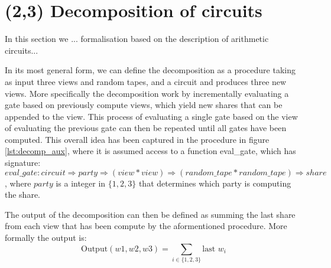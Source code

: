 \section{(2,3) Decomposition of circuits}
\label{sec:decomposition}
In this section we ... formalisation based on the description of arithmetic circuits...

In its most general form, we can define the decomposition as a procedure taking
as input three views and random tapes, and a circuit and produces three new
views. 
More specifically the decomposition work by incrementally evaluating a gate based on
previously compute views, which yield new shares that can be appended to the
view. This process of evaluating a single gate based on the view of evaluating
the previous gate can then be repeated until all gates have been computed. This
overall idea has been captured in the procedure in figure \ref{lst:decomp_aux},
where it is assumed access to a function eval\_gate, which has signature:
$eval\_gate : circuit \Rightarrow party \Rightarrow (view * view) \Rightarrow (random\_tape * random\_tape) \Rightarrow share$,
where $party$ is a integer in $\{1,2,3\}$ that determines which party is
computing the share. 

The output of the decomposition can then be defined as summing the last share from each view that has been compute by the aformentioned procedure. More formally the output is:
\begin{equation}
  \text{Output}(w1, w2, w3) = \sum_{i \in \{1,2,3\}} \text{last } w_{i}
\end{equation}


